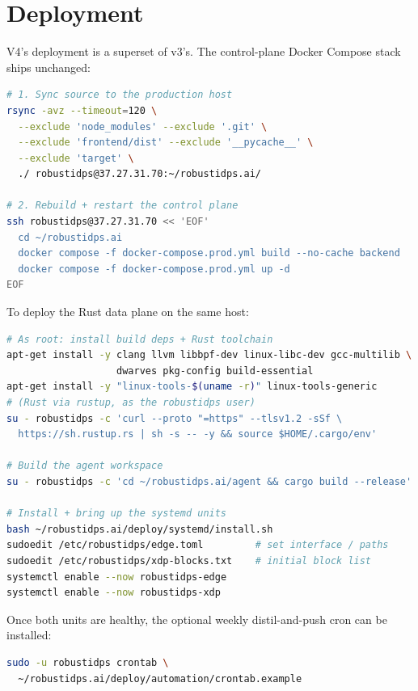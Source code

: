 \documentclass[11pt,a4paper]{article}
\begin{document}
\section{Deployment}
\label{sec:deployment_legacy}

V4's deployment is a superset of v3's.  The control-plane Docker
Compose stack ships unchanged:

\begin{lstlisting}[language=bash]
# 1. Sync source to the production host
rsync -avz --timeout=120 \
  --exclude 'node_modules' --exclude '.git' \
  --exclude 'frontend/dist' --exclude '__pycache__' \
  --exclude 'target' \
  ./ robustidps@37.27.31.70:~/robustidps.ai/

# 2. Rebuild + restart the control plane
ssh robustidps@37.27.31.70 << 'EOF'
  cd ~/robustidps.ai
  docker compose -f docker-compose.prod.yml build --no-cache backend
  docker compose -f docker-compose.prod.yml up -d
EOF
\end{lstlisting}

To deploy the Rust data plane on the same host:

\begin{lstlisting}[language=bash]
# As root: install build deps + Rust toolchain
apt-get install -y clang llvm libbpf-dev linux-libc-dev gcc-multilib \
                   dwarves pkg-config build-essential
apt-get install -y "linux-tools-$(uname -r)" linux-tools-generic
# (Rust via rustup, as the robustidps user)
su - robustidps -c 'curl --proto "=https" --tlsv1.2 -sSf \
  https://sh.rustup.rs | sh -s -- -y && source $HOME/.cargo/env'

# Build the agent workspace
su - robustidps -c 'cd ~/robustidps.ai/agent && cargo build --release'

# Install + bring up the systemd units
bash ~/robustidps.ai/deploy/systemd/install.sh
sudoedit /etc/robustidps/edge.toml         # set interface / paths
sudoedit /etc/robustidps/xdp-blocks.txt    # initial block list
systemctl enable --now robustidps-edge
systemctl enable --now robustidps-xdp
\end{lstlisting}

Once both units are healthy, the optional weekly distil-and-push cron
can be installed:

\begin{lstlisting}[language=bash]
sudo -u robustidps crontab \
  ~/robustidps.ai/deploy/automation/crontab.example
\end{lstlisting}
\end{document}

